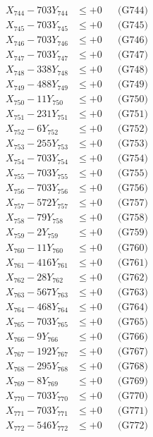 \documentclass[a4paper,10pt]{article}
\begin{document}
{\begin{align}
X_{744} - 703Y_{744} &\leq +0 && \text{(G744)} \\
X_{745} - 703Y_{745} &\leq +0 && \text{(G745)} \\
X_{746} - 703Y_{746} &\leq +0 && \text{(G746)} \\
X_{747} - 703Y_{747} &\leq +0 && \text{(G747)} \\
X_{748} - 338Y_{748} &\leq +0 && \text{(G748)} \\
X_{749} - 488Y_{749} &\leq +0 && \text{(G749)} \\
X_{750} - 11Y_{750} &\leq +0 && \text{(G750)} \\
\allowbreak
X_{751} - 231Y_{751} &\leq +0 && \text{(G751)} \\
X_{752} - 6Y_{752} &\leq +0 && \text{(G752)} \\
X_{753} - 255Y_{753} &\leq +0 && \text{(G753)} \\
X_{754} - 703Y_{754} &\leq +0 && \text{(G754)} \\
X_{755} - 703Y_{755} &\leq +0 && \text{(G755)} \\
X_{756} - 703Y_{756} &\leq +0 && \text{(G756)} \\
X_{757} - 572Y_{757} &\leq +0 && \text{(G757)} \\
X_{758} - 79Y_{758} &\leq +0 && \text{(G758)} \\
X_{759} - 2Y_{759} &\leq +0 && \text{(G759)} \\
X_{760} - 11Y_{760} &\leq +0 && \text{(G760)} \\
\allowbreak
X_{761} - 416Y_{761} &\leq +0 && \text{(G761)} \\
X_{762} - 28Y_{762} &\leq +0 && \text{(G762)} \\
X_{763} - 567Y_{763} &\leq +0 && \text{(G763)} \\
X_{764} - 468Y_{764} &\leq +0 && \text{(G764)} \\
X_{765} - 703Y_{765} &\leq +0 && \text{(G765)} \\
X_{766} - 9Y_{766} &\leq +0 && \text{(G766)} \\
X_{767} - 192Y_{767} &\leq +0 && \text{(G767)} \\
X_{768} - 295Y_{768} &\leq +0 && \text{(G768)} \\
X_{769} - 8Y_{769} &\leq +0 && \text{(G769)} \\
X_{770} - 703Y_{770} &\leq +0 && \text{(G770)} \\
\allowbreak
X_{771} - 703Y_{771} &\leq +0 && \text{(G771)} \\
X_{772} - 546Y_{772} &\leq +0 && \text{(G772)} \\

\end{align}}
\end{document}
